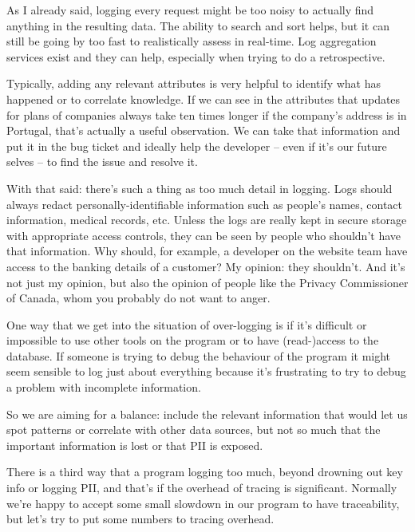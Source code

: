 \documentclass[a4paper]{report}
\begin{document}
As I already said, logging every request might be too noisy to actually find anything in the resulting data. The ability to search and sort helps, but it can still be going by too fast to realistically assess in real-time. Log aggregation services exist and they can help, especially when trying to do a retrospective.

Typically, adding any relevant attributes is very helpful to identify what has happened or to correlate knowledge. If we can see in the attributes that updates for plans of companies always take ten times longer if the company's address is in Portugal, that's actually a useful observation. We can take that information and put it in the bug ticket and ideally help the developer -- even if it's our future selves -- to find the issue and resolve it.

With that said: there's such a thing as too much detail in logging. Logs should always redact personally-identifiable information such as people's names, contact information, medical records, etc. Unless the logs are really kept in secure storage with appropriate access controls, they can be seen by people who shouldn't have that information. Why should, for example, a developer on the website team have access to the banking details of a customer? My opinion: they shouldn't. And it's not just my opinion, but also the opinion of people like the Privacy Commissioner of Canada, whom you probably do not want to anger.

One way that we get into the situation of over-logging is if it's difficult or impossible to use other tools on the program or to have (read-)access to the database. If someone is trying to debug the behaviour of the program it might seem sensible to log just about everything because it's frustrating to try to debug a problem with incomplete information. 

So we are aiming for a balance: include the relevant information that would let us spot patterns or correlate with other data sources, but not so much that the important information is lost or that PII is exposed.

There is a third way that a program logging too much, beyond drowning out key info or logging PII, and that's if the overhead of tracing is significant. Normally we're happy to accept some small slowdown in our program to have traceability, but let's try to put some numbers to tracing overhead. 
\end{document}
